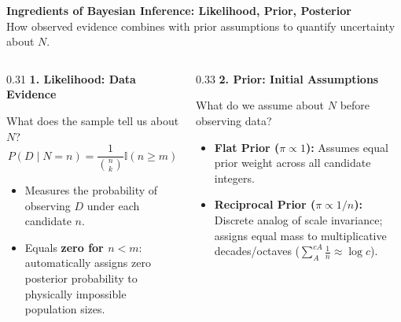 \documentclass[aspectratio=169,10pt]{beamer}
\begin{document}
\begin{frame}[c]
  \begin{center}
    {\large \textbf{\color{headernavy} Ingredients of Bayesian Inference: Likelihood, Prior, Posterior}}\\[0.10cm]
    {\scriptsize \color{subgray} How observed evidence combines with prior assumptions to quantify uncertainty about $N$.}
  \end{center}
  \vspace{0.35cm}
  
  \begin{columns}[t,onlytextwidth]
    \begin{column}{0.31\textwidth}
      {\small \textbf{\color{accentblue} 1. Likelihood: Data Evidence}}\\[0.06cm]
      {\scriptsize What does the sample tell us about $N$?
      \begin{equation*}
        P(D \mid N = n) = \frac{1}{\binom{n}{k}} \mathbb{I}(n \ge m)
      \end{equation*}
      \begin{itemize}
        \setlength{\itemsep}{0.06cm}
        \item Measures the probability of observing $D$ under each candidate $n$.
        \item Equals \textbf{zero for $n < m$}: automatically assigns zero posterior probability to physically impossible population sizes.
      \end{itemize}}
    \end{column}
    
    \begin{column}{0.33\textwidth}
      {\small \textbf{\color{accentgreen} 2. Prior: Initial Assumptions}}\\[0.06cm]
      {\scriptsize What do we assume about $N$ before observing data?
      \begin{itemize}
        \setlength{\itemsep}{0.06cm}
        \item \textbf{Flat Prior ($\pi \propto 1$):} Assumes equal prior weight across all candidate integers.
        \item \textbf{Reciprocal Prior ($\pi \propto 1/n$):} Discrete analog of scale invariance; assigns equal mass to multiplicative decades/octaves ($\sum_A^{cA} \frac{1}{n} \approx \log c$).
      \end{itemize}}
    \end{column}
    

\end{columns}
\end{frame}
\end{document}
